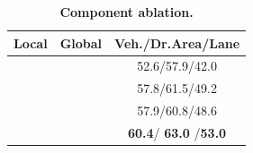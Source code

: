 \documentclass{article}
\newcommand{\cmark}{\ding{51}}%
\begin{document}
{%


\begin{table}
\vspace{-4mm}
\centering
\footnotesize
\setlength{\tabcolsep}{1.5pt}
\renewcommand{\arraystretch}{1.}
\caption{\textbf{Component ablation.}}
\vspace{-1mm}
\label{tab:ablation_grid_window}
\begin{tabular}{ccc}
\cellcolor{lightgray}  {Local} &
 \cellcolor{lightgray} {Global} &
 \cellcolor{lightgray} {Veh./Dr.Area/Lane}\\ \toprule
  &  &   52.6/57.9/42.0\\
\cmark  &  &  57.8/61.5/49.2 \\
 & \cmark & 57.9/60.8/48.6   \\
 \cmark & \cmark & \textbf{60.4}/ \textbf{63.0} /\textbf{53.0} \\ \bottomrule
\end{tabular}
\vspace{-4mm}
\end{table}



}
\end{document}
